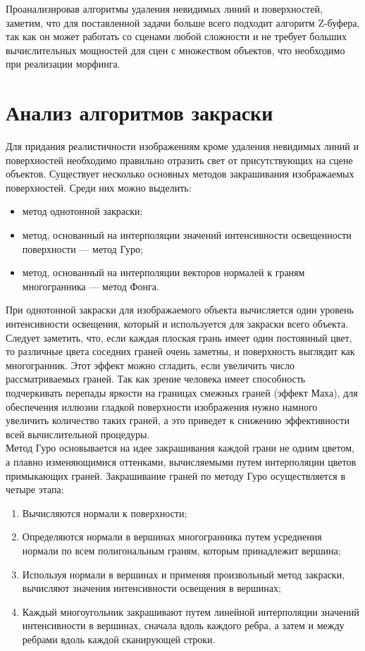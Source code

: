 Проанализировав алгоритмы удаления невидимых линий и поверхностей, заметим, что для поставленной задачи больше всего подходит алгоритм Z-буфера, так как он может работать со сценами любой сложности и не требует больших вычислительных мощностей для сцен с множеством объектов, что необходимо при реализации морфинга.

\newpage

\section{Анализ алгоритмов закраски}

Для придания реалистичности изображениям кроме удаления невидимых линий и поверхностей необходимо правильно отразить свет от присутствующих на сцене объектов. Существует несколько основных методов закрашивания изображаемых поверхностей. Среди них можно выделить:

\begin{itemize}[label*=---]
	\item метод однотонной закраски;
	\item метод, основанный на интерполяции значений интенсивности освещенности поверхности --- метод Гуро;
	\item метод, основанный на интерполяции векторов нормалей к граням многогранника --- метод Фонга.
\end{itemize}

При однотонной закраски для изображаемого объекта вычисляется один уровень интенсивности освещения, который и используется для закраски всего объекта. Следует заметить, что, если каждая плоская грань имеет один постоянный цвет, то различные цвета соседних граней очень заметны, и поверхность выглядит как многогранник. Этот эффект можно сгладить, если увеличить число рассматриваемых граней. Так как зрение человека имеет способность подчеркивать перепады яркости на границах смежных граней (эффект Маха), для обеспечения иллюзии гладкой поверхности изображения нужно намного увеличить количество таких граней, а это приведет к снижению эффективности всей вычислительной процедуры.\\

Метод Гуро основывается на идее закрашивания каждой грани не одним цветом, а плавно изменяющимися оттенками, вычисляемыми путем интерполяции цветов примыкающих граней. Закрашивание граней по методу Гуро осуществляется в четыре этапа:

\begin{enumerate}
	\item Вычисляются нормали к поверхности;
	\item Определяются нормали в вершинах многогранника путем усреднения нормали по всем полигональным граням, которым принадлежит вершина;
	\item Используя нормали в вершинах и применяя произвольный метод закраски, вычисляют значения интенсивности освещения в вершинах;
	\item Каждый многоугольник закрашивают путем линейной интерполяции значений интенсивности в вершинах, сначала вдоль каждого ребра, а затем и между ребрами вдоль каждой сканирующей строки.
\end{enumerate}

